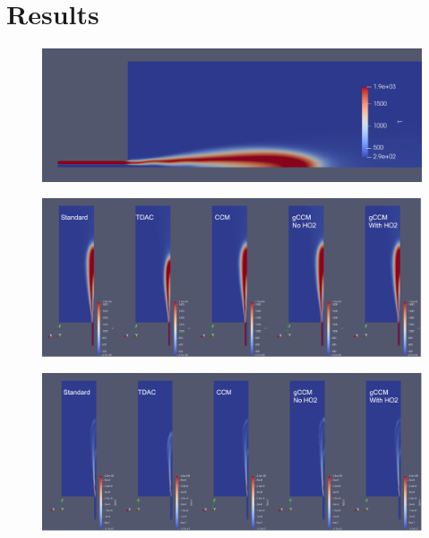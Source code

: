 \section*{Results}
\begin{figure}[H]
    \centering
    \includegraphics[width=0.95\linewidth]{figs/SandiaD/Screenshot from 2025-03-12 06-59-03.png}
    \label{fig:domain}
\end{figure}

\begin{figure}[H]
    \centering
    \includegraphics[width=0.95\linewidth]{figs/SandiaD/Screenshot from 2025-03-12 06-59-49.png}
    \label{fig:domain}
\end{figure}

\begin{figure}[H]
    \centering
    \includegraphics[width=0.95\linewidth]{figs/SandiaD/Screenshot from 2025-03-12 07-00-20.png}
    \label{fig:domain}
\end{figure}

